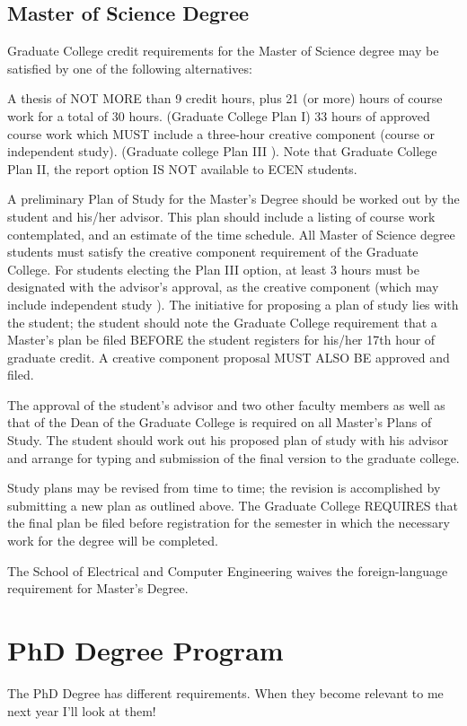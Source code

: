 \subsection{Master of Science Degree}

Graduate College credit requirements for the Master of Science degree may be satisfied by one of the following alternatives:

A thesis of NOT MORE than 9 credit hours, plus 21 (or more) hours of course work for a total of 30 hours. (Graduate College Plan I)
33 hours of approved course work which MUST include a three-hour creative component (course or independent study). (Graduate college Plan III ).
Note that Graduate College Plan II, the report option IS NOT available to ECEN students.

A preliminary Plan of Study for the Master's Degree should be worked out by the student and his/her advisor. This plan should include a listing of course work contemplated, and an estimate of the time schedule. All Master of Science degree students must satisfy the creative component requirement of the Graduate College. For students electing the Plan III option, at least 3 hours must be designated with the advisor's approval, as the creative component (which may include independent study ). The initiative for proposing a plan of study lies with the student; the student should note the Graduate College requirement that a Master's plan be filed BEFORE the student registers for his/her 17th hour of graduate credit. A creative component proposal MUST ALSO BE approved and filed.

The approval of the student's advisor and two other faculty members as well as that of the Dean of the Graduate College is required on all Master's Plans of Study. The student should work out his proposed plan of study with his advisor and arrange for typing and submission of the final version to the graduate college.

Study plans may be revised from time to time; the revision is accomplished by submitting a new plan as outlined above. The Graduate College REQUIRES that the final plan be filed before registration for the semester in which the necessary work for the degree will be completed.

The School of Electrical and Computer Engineering waives the foreign-language requirement for Master's Degree.

\section{PhD Degree Program}
The PhD Degree has different requirements. When they become relevant to me next year I'll look at them!

